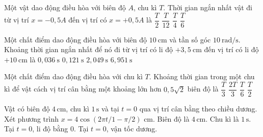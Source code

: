 \begin{ex}
Một vật dao động điều hòa với biên độ $A$, chu kì $T$. Thời gian ngắn nhất vật đi từ vị trí $x=-0{,}5A$ đến vị trí có $x=+0{,}5A$ là
\choice
{$\dfrac{T}{2}$}
{$\dfrac{T}{12}$}
{$\dfrac{T}{4}$}
{\True $\dfrac{T}{6}$}
\end{ex}

\begin{ex}
Một chất điểm dao động điều hòa với biên độ $10\ \text{cm}$ và tần số góc $10\ \text{rad/s}$. Khoảng thời gian ngắn nhất để nó đi từ vị trí có li độ $+3,5\ \text{cm}$ đến vị trí có li độ $+10\ \text{cm}$ là
\choice
{$0,036\ \text{s}$}
{\True $0,121\ \text{s}$}
{$2,049\ \text{s}$}
{$6,951\ \text{s}$}
\end{ex}

\begin{ex}
Một chất điểm dao động điều hòa với chu kì $T$. Khoảng thời gian trong một chu kì để vật cách vị trí cân bằng một khoảng lớn hơn $0,5\sqrt{2}$ biên độ là
\choice
{$\dfrac{T}{3}$}
{$\dfrac{2T}{3}$}
{$\dfrac{T}{6}$}
{\True $\dfrac{T}{2}$}
\end{ex}

\begin{ex}
Vật có biên độ $4\,\text{cm}$, chu kì $1\,\text{s}$ và tại $t=0$ qua vị trí cân bằng theo chiều dương. Xét phương trình $x=4\cos(2\pi t/1-\pi/2)$ cm.
\choiceTF
{\True Biên độ là $4\,\text{cm}$.}
{\True Chu kì là $1\,\text{s}$.}
{\True Tại $t=0$, li độ bằng 0.}
{\True Tại $t=0$, vận tốc dương.}
\end{ex}

